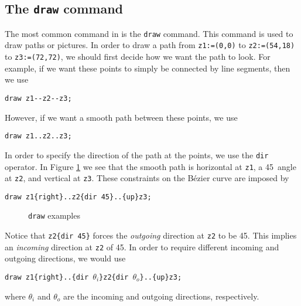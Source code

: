 \subsection{The \texttt{draw} command}

The most common command in \MP{} is the \texttt{draw} command.  This
command is used to draw paths or pictures.  In order to draw a path from
\texttt{z1:=(0,0)} to \texttt{z2:=(54,18)} to \texttt{z3:=(72,72)}, we
should first decide how we want the path to look.  For example, if we
want these points to simply be connected by line segments, then we
use

\begin{center}
  \verb|draw z1--z2--z3;|
\end{center}

However, if we want a smooth path between these points, we use

\begin{center}
  \verb|draw z1..z2..z3;|
\end{center}

In order to specify the direction of the path at the points, we use the
\texttt{dir} operator.  In Figure \ref{fig:draw1} we see that the smooth
path is horizontal at \texttt{z1}, a 45\textdegree\ angle at
\texttt{z2}, and vertical at \texttt{z3}.  These constraints on the
B\'{e}zier curve are imposed by

\begin{center}
  \verb|draw z1{right}..z2{dir 45}..{up}z3;|
\end{center}

\begin{figure}[hptb]
	\begin{center}
  \end{center}
	\caption{\texttt{draw} examples}
  \label{fig:draw1}
\end{figure}

Notice that \verb|z2{dir 45}| forces the \textit{outgoing} direction at
\texttt{z2} to be 45\textdegree.  This implies an \textit{incoming}
direction at \texttt{z2} of 45\textdegree.  In order to require
different incoming and outgoing directions, we would use

\begin{center}
  \verb|draw z1{right}..{dir |$\theta_i$\verb|}z2{dir |$\theta_o$\verb|}..{up}z3;|
\end{center}

where $\theta_i$ and $\theta_o$ are the incoming and outgoing
directions, respectively.
